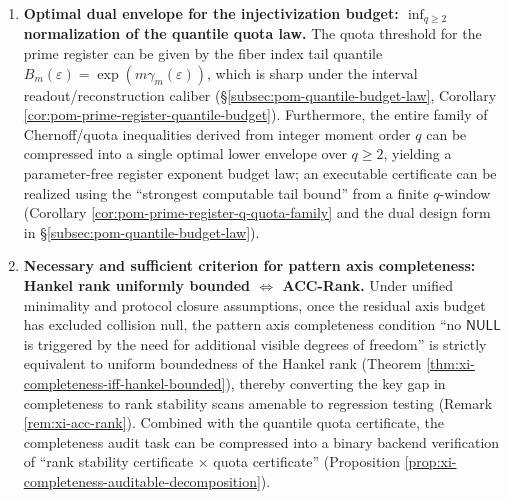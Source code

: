\begin{enumerate}
  \item \textbf{Optimal dual envelope for the injectivization budget: \(\inf_{q\ge 2}\) normalization of the quantile quota law.}
  The quota threshold for the prime register can be given by the fiber index tail quantile \(B_m(\varepsilon)=\exp(m\gamma_m(\varepsilon))\), which is sharp under the interval readout/reconstruction caliber (\S\ref{subsec:pom-quantile-budget-law}, Corollary \ref{cor:pom-prime-register-quantile-budget}).
  Furthermore, the entire family of Chernoff/quota inequalities derived from integer moment order \(q\) can be compressed into a single optimal lower envelope over \(q\ge 2\), yielding a parameter-free register exponent budget law; an executable certificate can be realized using the ``strongest computable tail bound'' from a finite \(q\)-window (Corollary \ref{cor:pom-prime-register-q-quota-family} and the dual design form in \S\ref{subsec:pom-quantile-budget-law}).

  \item \textbf{Necessary and sufficient criterion for pattern axis completeness: Hankel rank uniformly bounded \(\Longleftrightarrow\) ACC-Rank.}
  Under unified minimality and protocol closure assumptions, once the residual axis budget has excluded collision null, the pattern axis completeness condition ``no \(\mathsf{NULL}\) is triggered by the need for additional visible degrees of freedom'' is strictly equivalent to uniform boundedness of the Hankel rank (Theorem \ref{thm:xi-completeness-iff-hankel-bounded}), thereby converting the key gap in completeness to rank stability scans amenable to regression testing (Remark \ref{rem:xi-acc-rank}).
  Combined with the quantile quota certificate, the completeness audit task can be compressed into a binary backend verification of ``rank stability certificate \(\times\) quota certificate'' (Proposition \ref{prop:xi-completeness-auditable-decomposition}).
\end{enumerate}

